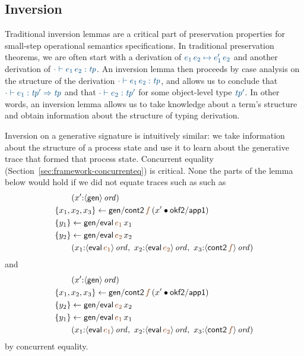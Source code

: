 \subsection{Inversion}\label{sec:inversion-genorder}

Traditional inversion lemmas are a critical part of preservation
properties for small-step operational semantics specifications. In 
traditional preservation theorems, we are often start with a derivation of
$\obj{e_1\,e_2 \mapsto e_1'\,e_2}$ and another derivation of
$\obj{\cdot \vdash e_1\,e_2 : {\it tp}}$. An inversion lemma then proceeds
by case analysis on the structure of the derivation 
$\obj{\cdot \vdash e_1\,e_2 : {\it tp}}$, and allows us to conclude that
$\obj{\cdot \vdash e_1 : {\it tp'} \Rightarrow {\it tp}}$
and that $\obj{\cdot \vdash e_2 : {\it tp'} }$ for some object-level
type $\obj{\it tp'}$.  In other words, an inversion lemma allows us to 
take knowledge about a term's structure and obtain information about 
the structure of typing derivation. 

Inversion on a generative signature is intuitively similar: we take
information about the structure of a process state and use it to learn
about the generative trace that formed that process state. Concurrent
equality (Section~\ref{sec:framework-concurrenteq}) is critical.
None the parts of the lemma below would hold if we did not
equate traces such as such as
\begin{align*}
& \qquad (x'{:}\istrue{\susp{{\sf gen}}})
\\
& \trstep{x_1, x_2, x_3}{{\sf gen/cont2}\,\lf{f}\,(x' \fuse {\sf okf2/app1})}
\\
& \trstep{y_1}{{\sf gen/eval}\,\lf{e_1}\,x_1}
\\
& \trstep{y_2}{{\sf gen/eval}\,\lf{e_2}\,x_2}
\\
& \qquad (x_1{:}\istrue{\susp{{\sf eval}\,\lf{e_1}}}, ~
          x_2{:}\istrue{\susp{{\sf eval}\,\lf{e_2}}}, ~
          x_3{:}\istrue{\susp{{\sf cont2}\,\lf{f}}})
\end{align*}
and
\begin{align*}
& \qquad (x'{:}\istrue{\susp{{\sf gen}}})
\\
& \trstep{x_1, x_2, x_3}{{\sf gen/cont2}\,\lf{f}\,(x' \fuse {\sf okf2/app1})}
\\
& \trstep{y_2}{{\sf gen/eval}\,\lf{e_2}\,x_2}
\\
& \trstep{y_1}{{\sf gen/eval}\,\lf{e_1}\,x_1}
\\
& \qquad (x_1{:}\istrue{\susp{{\sf eval}\,\lf{e_1}}}, ~
          x_2{:}\istrue{\susp{{\sf eval}\,\lf{e_2}}}, ~
          x_3{:}\istrue{\susp{{\sf cont2}\,\lf{f}}})
\end{align*}
by concurrent equality. 


